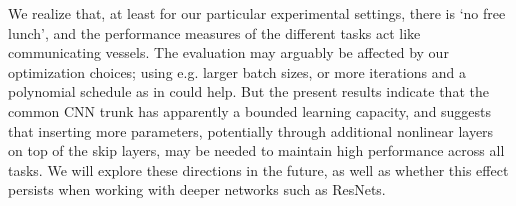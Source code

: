 \documentclass[10pt,twocolumn,letterpaper]{article}
\begin{document}
We realize that, at least for our particular experimental settings, there is `no free lunch', and the performance measures of the different tasks  act like communicating vessels.
 The evaluation may arguably be affected by our optimization choices; using e.g. larger batch sizes, or more iterations and a polynomial schedule as in \cite{ChenPK0Y16} could help. But the present results  indicate  that the common CNN trunk has apparently a bounded learning capacity, and suggests that inserting more parameters, potentially through additional nonlinear layers on top of the skip layers, may be needed to maintain high performance across all tasks. We will explore these directions in the future, as well as whether this effect persists when working with deeper networks such as ResNets.





\end{document}
